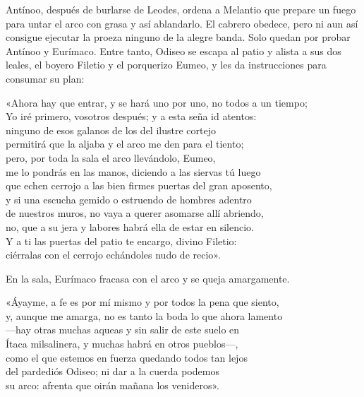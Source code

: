 Antínoo, después de burlarse de Leodes, ordena a Melantio que prepare un fuego para untar el arco con grasa y así ablandarlo. El cabrero obedece, pero ni aun así consigue ejecutar la proeza ninguno de la alegre banda. Solo quedan por probar Antínoo y Eurímaco. Entre tanto, Odiseo se escapa al patio y alista a sus dos leales, el boyero Filetio y el porquerizo Eumeo, y les da instrucciones para consumar su plan:

\begin{versocita}
«Ahora hay que entrar, y se hará uno por uno, no todos a un tiempo;\\
Yo iré primero, vosotros después; y a esta seña id atentos:\\
ninguno de esos galanos de los del ilustre cortejo\\
permitirá que la aljaba y el arco me den para el tiento;\\
pero, por toda la sala el arco llevándolo, Eumeo,\\
me lo pondrás en las manos, diciendo a las siervas tú luego\\
que echen cerrojo a las bien firmes puertas del gran aposento,\\
y si una escucha gemido o estruendo de hombres adentro\\
de nuestros muros, no vaya a querer asomarse allí abriendo,\\
no, que a su jera y labores habrá ella de estar en silencio.\\
Y a ti las puertas del patio te encargo, divino Filetio:\\
ciérralas con el cerrojo echándoles nudo de recio».
\end{versocita}

En la sala, Eurímaco fracasa con el arco y se queja amargamente.

\begin{versocita}
«Áyayme, a fe es por mí mismo y por todos la pena que siento,\\
y, aunque me amarga, no es tanto la boda lo que ahora lamento\\
---hay otras muchas aqueas y sin salir de este suelo en\\
Ítaca milsalinera, y muchas habrá en otros pueblos---,\\
como el que estemos en fuerza quedando todos tan lejos\\
del pardediós Odiseo; ni dar a la cuerda podemos\\
su arco: afrenta que oirán mañana los venideros».
\end{versocita}

